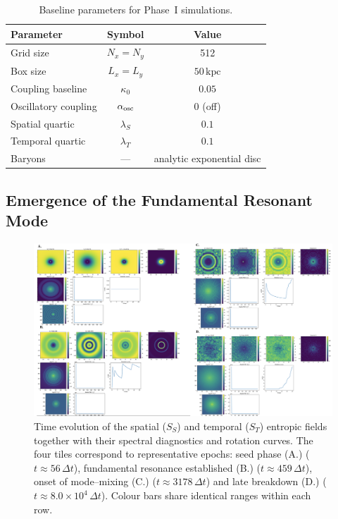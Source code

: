 \documentclass[11pt,a4paper]{article} %
\begin{document}
\begin{table}[h]
\centering
\begin{tabular}{lcc}
\hline
Parameter       & Symbol      & Value \\
\hline
Grid size       & $N_x=N_y$   & 512                     \\
Box size        & $L_x=L_y$   & $50\,\mathrm{kpc}$      \\
Coupling baseline & $\kappa_0$ & $0.05$                  \\
Oscillatory coupling & $\alpha_{\rm osc}$ & $0$ (off)     \\
Spatial quartic & $\lambda_S$ & $0.1$                   \\
Temporal quartic & $\lambda_T$ & $0.1$                  \\
Baryons         & —           & analytic exponential disc \\
\hline
\end{tabular}
\caption{Baseline parameters for Phase~I simulations.}
\label{tab:baseline}
\end{table}

\subsection{Emergence of the Fundamental Resonant Mode}

\begin{figure}[h]
  \centering
  \includegraphics[width=\textwidth]{Figure_1_entropic_spacetime.png}
  \caption{Time evolution of the spatial ($S_S$) and temporal ($S_T$)
           entropic fields together with their spectral diagnostics and rotation curves.
           The four tiles correspond to representative epochs: seed phase (A.)
           ($t\approx56\,\Delta t$), fundamental resonance established (B.)
           ($t\approx459\,\Delta t$), onset of mode–mixing (C.)
           ($t\approx3178\,\Delta t$) and late breakdown (D.)
           ($t\approx8.0\times10^{4}\,\Delta t$).
           Colour bars share identical ranges within each row.}
  \label{fig:evolution}
\end{figure}
\end{document}
